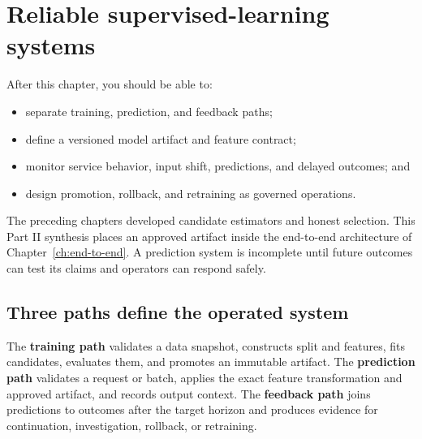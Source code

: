 \chapter{Reliable supervised-learning systems}
\label{ch:reliable-supervised-systems}

\begin{learningobjectives}
After this chapter, you should be able to:
\begin{itemize}
  \item separate training, prediction, and feedback paths;
  \item define a versioned model artifact and feature contract;
  \item monitor service behavior, input shift, predictions, and delayed outcomes; and
  \item design promotion, rollback, and retraining as governed operations.
\end{itemize}
\end{learningobjectives}

\begin{chapterconnection}
The preceding chapters developed candidate estimators and honest selection. This
Part II synthesis places an approved artifact inside the end-to-end architecture
of Chapter~\ref{ch:end-to-end}. A prediction system is incomplete until future
outcomes can test its claims and operators can respond safely.
\end{chapterconnection}

\section{Three paths define the operated system}

The \textbf{training path} validates a data snapshot, constructs split and
features, fits candidates, evaluates them, and promotes an immutable artifact.
The \textbf{prediction path} validates a request or batch, applies the exact
feature transformation and approved artifact, and records output context. The
\textbf{feedback path} joins predictions to outcomes after the target horizon
and produces evidence for continuation, investigation, rollback, or retraining.

